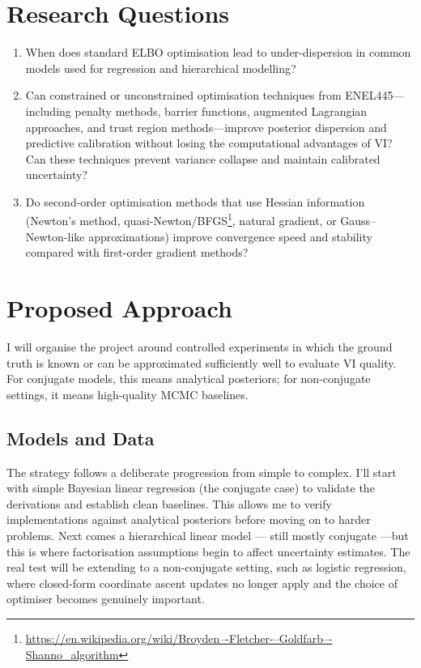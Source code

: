 \documentclass[11pt,a4paper]{article}
\begin{document}
\section{Research Questions}

\begin{enumerate}[nosep]
\item When does standard ELBO optimisation lead to under-dispersion in common models used for regression and hierarchical modelling?

\item Can constrained or unconstrained optimisation techniques from ENEL445---including penalty methods, barrier functions, augmented Lagrangian approaches, and trust region methods---improve posterior dispersion and predictive calibration without losing the computational advantages of VI? Can these techniques prevent variance collapse and maintain calibrated uncertainty?

\item Do second-order optimisation methods that use Hessian information (Newton's method, quasi-Newton/BFGS\footnote{\url{https://en.wikipedia.org/wiki/Broyden–-Fletcher-–Goldfarb–-Shanno_algorithm}}, natural gradient, or Gauss--Newton-like approximations) improve convergence speed and stability compared with first-order gradient methods?
\end{enumerate}

\section{Proposed Approach}

I will organise the project around controlled experiments in which the ground truth is known or can be approximated sufficiently well to evaluate VI quality. For conjugate models, this means analytical posteriors; for non-conjugate settings, it means high-quality MCMC baselines.

\subsection{Models and Data}

The strategy follows a deliberate progression from simple to complex. I'll start with simple Bayesian linear regression (the conjugate case) to validate the derivations and establish clean baselines. This allows me to verify implementations against analytical posteriors before moving on to harder problems. Next comes a hierarchical linear model — still mostly conjugate —but this is where factorisation assumptions begin to affect uncertainty estimates. The real test will be extending to a non-conjugate setting, such as logistic regression, where closed-form coordinate ascent updates no longer apply and the choice of optimiser becomes genuinely important.
\end{document}
